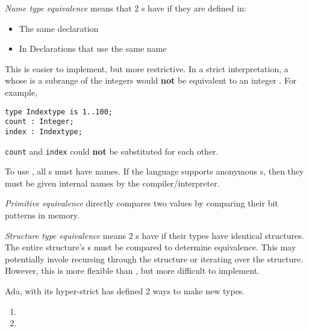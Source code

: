 \begin{definition}\label{def:Type_Equivalence-Name}
  \emph{Name type equivalence} means that 2 s have  if they are defined in:
  \begin{itemize}[noitemsep]
  \item The same declaration
  \item In Declarations that use the same  name
  \end{itemize}

  This is easier to implement, but more restrictive.
  In a strict interpretation, a  whose  is a subrange of the integers would \textbf{not} be equivalent to an integer  .
  For example,
\begin{verbatim}
type Indextype is 1..100;
count : Integer;
index : Indextype;
\end{verbatim}
  \texttt{count} and \texttt{index} could \textbf{not} be substituted for each other.

  \begin{remark}
    To use , all s must have names.
    If the language supports anonymous s, then they must be given internal names by the compiler/interpreter.
  \end{remark}
\end{definition}

\begin{definition}\label{def:Type_Equivalence-Primitive}
  \emph{Primitive equivalence} directly compares two values by comparing their bit patterns in memory.
\end{definition}

\begin{definition}\label{def:Type_Equivalence-Structure}
  \emph{Structure type equivalence} means 2 s have  if their types have identical structures.
  The entire structure's s must be compared to determine equivalence.
  This may potentially invole recursing through the structure or iterating over the structure.
  However, this is more flexible than , but more difficult to implement.

  Ada, with its hyper-strict  has defined 2 ways to make new types.
  \begin{enumerate}[noitemsep]
  \item {}
  \item {}
  \end{enumerate}
\end{definition}

